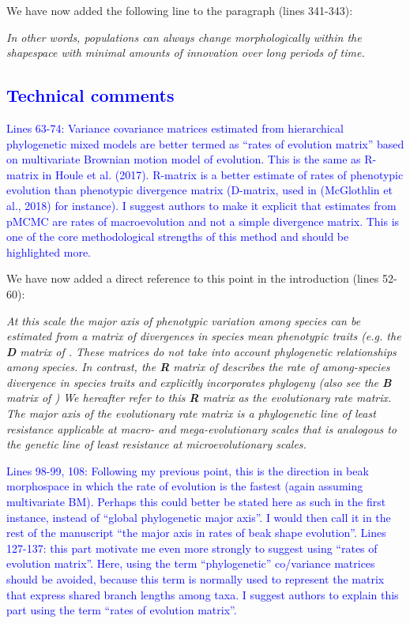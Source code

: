 \documentclass[12pt,letterpaper]{article}
\begin{document}
{We have now added the following line to the paragraph (lines 341-343):

\noindent\textit{In other words, populations can always change morphologically within the shapespace with minimal amounts of innovation over long periods of time.} %

\subsection*{\textcolor{blue}{Technical comments}}

\textcolor{blue}{Lines 63-74: Variance covariance matrices estimated from hierarchical phylogenetic mixed models are better termed as “rates of evolution matrix” based on multivariate Brownian motion model of evolution. This is the same as R-matrix in Houle et al. (2017). R-matrix is a better estimate of rates of phenotypic evolution than phenotypic divergence matrix (D-matrix, used in (McGlothlin et al., 2018) for instance). I suggest authors to make it explicit that estimates from pMCMC are rates of macroevolution and not a simple divergence matrix. This is one of the core methodological strengths of this method and should be highlighted more.}

We have now added a direct reference to this point in the introduction (lines 52-60):

\noindent\textit{At this scale the major axis of phenotypic variation among species \cite{marroig2005size, fasanelli2022allometry} can be estimated from a matrix of divergences in species mean phenotypic traits (e.g. the \textbf{D} matrix of \cite{BlowsHiggie2003, mcglothlin2018adaptive}.
These matrices do not take into account phylogenetic relationships among species.
In contrast, the \textbf{R} matrix of \cite{Houle2017} describes the rate of among-species divergence in species traits and explicitly incorporates phylogeny (also see the \textbf{B} matrix of \cite{Machado2020}) %
We hereafter refer to this \textbf{R} matrix as the \textit{evolutionary rate matrix}. %
The major axis of the evolutionary rate matrix is a phylogenetic line of least resistance applicable at macro- and mega-evolutionary scales that is analogous to the genetic line of least resistance at microevolutionary scales.
}

\textcolor{blue}{Lines 98-99, 108: Following my previous point, this is the direction in beak morphospace in which the rate of evolution is the fastest (again assuming multivariate BM). Perhaps this could better be stated here as such in the first instance, instead of “global phylogenetic major axis”. I would then call it in the rest of the manuscript “the major axis in rates of beak shape evolution”.
Lines 127-137: this part motivate me even more strongly to suggest using “rates of evolution matrix”. Here, using the term “phylogenetic” co/variance matrices should be avoided, because this term is normally used to represent the matrix that express shared branch lengths among taxa. I suggest authors to explain this part using the term “rates of evolution matrix”.}

}
\end{document}
